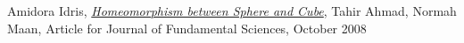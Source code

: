 \clearpage
{}
\begin{thebibliography}{25}

  Amidora Idris,
  \href{http://eprints.utm.my/10096/1/AmidoraIdris2008_HomeomorphismBetweenSphereandCube.pdf}{\emph{Homeomorphism between Sphere and Cube}},
  Tahir Ahmad, Normah Maan,
  Article for Journal of Fundamental Sciences,
  October 2008

\end{thebibliography}


